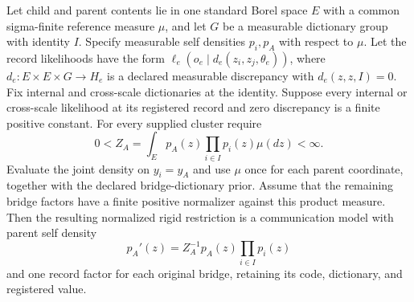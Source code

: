 \documentclass[11pt,letterpaper]{report}
\begin{document}
Let child and parent contents lie in one standard Borel space $E$ with a common sigma-finite reference measure $\mu$, and let $G$ be a measurable dictionary group with identity $I$. Specify measurable self densities $p_i,p_A$ with respect to $\mu$. Let the record likelihoods have the form $\ell_e(o_e\mid d_e(z_i,z_j,\theta_e))$, where $d_e:E\times E\times G\to H_e$ is a declared measurable discrepancy with $d_e(z,z,I)=0$. Fix internal and cross-scale dictionaries at the identity. Suppose every internal or cross-scale likelihood at its registered record and zero discrepancy is a finite positive constant. For every supplied cluster require
\begin{equation}
0<Z_A=\int_E p_A(z)\prod_{i\in I}p_i(z)\mu(dz)<\infty.
\label{it3:rigid-normalizer}
\end{equation}
Evaluate the joint density on $y_i=y_A$ and use $\mu$ once for each parent coordinate, together with the declared bridge-dictionary prior. Assume that the remaining bridge factors have a finite positive normalizer against this product measure. Then the resulting normalized rigid restriction is a communication model with parent self density
\begin{equation}
p_A'(z)=Z_A^{-1}p_A(z)\prod_{i\in I}p_i(z)
\label{it3:parent-density}
\end{equation}
and one record factor for each original bridge, retaining its code, dictionary, and registered value.
\end{document}
